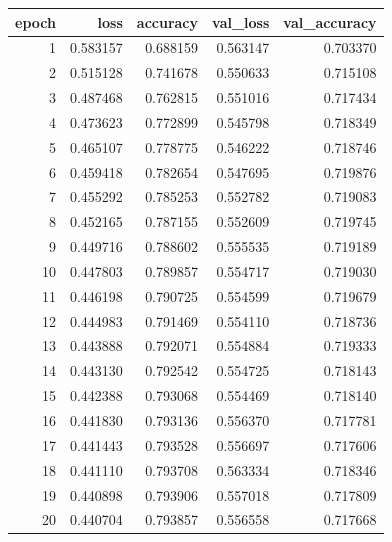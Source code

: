 \begin{tabular}{rrrrr}
\toprule
epoch & loss & accuracy & val_loss & val_accuracy \\
\midrule
1 & 0.583157 & 0.688159 & 0.563147 & 0.703370 \\
2 & 0.515128 & 0.741678 & 0.550633 & 0.715108 \\
3 & 0.487468 & 0.762815 & 0.551016 & 0.717434 \\
4 & 0.473623 & 0.772899 & 0.545798 & 0.718349 \\
5 & 0.465107 & 0.778775 & 0.546222 & 0.718746 \\
6 & 0.459418 & 0.782654 & 0.547695 & 0.719876 \\
7 & 0.455292 & 0.785253 & 0.552782 & 0.719083 \\
8 & 0.452165 & 0.787155 & 0.552609 & 0.719745 \\
9 & 0.449716 & 0.788602 & 0.555535 & 0.719189 \\
10 & 0.447803 & 0.789857 & 0.554717 & 0.719030 \\
11 & 0.446198 & 0.790725 & 0.554599 & 0.719679 \\
12 & 0.444983 & 0.791469 & 0.554110 & 0.718736 \\
13 & 0.443888 & 0.792071 & 0.554884 & 0.719333 \\
14 & 0.443130 & 0.792542 & 0.554725 & 0.718143 \\
15 & 0.442388 & 0.793068 & 0.554469 & 0.718140 \\
16 & 0.441830 & 0.793136 & 0.556370 & 0.717781 \\
17 & 0.441443 & 0.793528 & 0.556697 & 0.717606 \\
18 & 0.441110 & 0.793708 & 0.563334 & 0.718346 \\
19 & 0.440898 & 0.793906 & 0.557018 & 0.717809 \\
20 & 0.440704 & 0.793857 & 0.556558 & 0.717668 \\
\bottomrule
\end{tabular}

